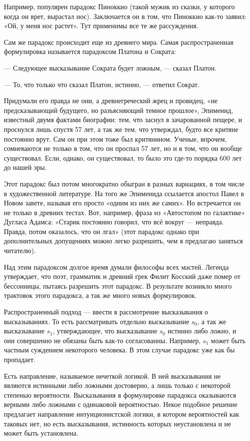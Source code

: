 Например, популярен парадокс Пиноккио (такой мужик из сказки, у которого когда он врет, вырастал нос). Заключается он в том, что Пиноккио как-то заявил: «Ой, у меня нос растет». Тут применимы все те же рассуждения.

Сам же парадокс происходит еще из древнего мира. Самая распространенная формулировка называется парадоксом Платона и Сократа:

— Следующее высказывание Сократа будет ложным, — сказал Платон.

— То, что только что сказал Платон, истинно, — ответил Сократ.

Придумали его правда не они, а древнегреческий жрец и провидец, «не предсказывающий будущего, но разъясняющий темное прошлое», Эпименид, известный двумя фактами биографии: тем, что заснул в зачарованной пещере, и проснулся лишь спустя 57 лет, а так же тем, что утверждал, будто все критяне постоянно врут. Сам он при этом тоже был критянином. Ученые, впрочем, сомневаются не только в том, что он проспал 57 лет, но и в том, что он вообще существовал. Если, однако, он существовал, то было это где-то порядка 600 лет до нашей эры.

Этот парадокс был потом многократно обыгран в разных вариациях, в том числе в художественной литературе. На того же Эпименида ссылается апостол Павел в Новом завете, называя его просто «одним из них же самих». Но встречается он не только в древних тестах. Вот, например, фраза из «Автостопом по галактике» Дугласа Адамса: «Старик постоянно говорил, что всё вокруг — неправда. Правда, потом оказалось, что он лгал» (этот парадокс однако при дополнительных допущениях можно легко разрешить, чем я предлагаю заняться читателю).

Над этим парадоксом долгое время думали философы всех мастей. Легенда утверждает, что поэт, грамматик и древний грек Филит Косский даже помер от бессонницы, пытаясь разрешить этот парадокс. В результате возникло много трактовок этого парадокса, а так же много новых формулировок.

Распространенный подход — ввести в рассмотрение высказывания о высказываниях. То есть рассматривать отдельно высказывание $s_0$, а так же высказывание $s_1$, утверждающее, что высказывание $s_0$ истинно либо ложно, и они совершенно не обязаны быть как-то согласованны. Например, $s_1$ может быть частным суждением некоторого человека. В этом случае парадокс уже как бы пропадает.

Есть направление, называемое нечеткой логикой. В ней высказывания не являются истинными либо ложными достоверно, а лишь только с некоторой степенью вероятности. Высказывания в формулировке парадокса оказываются верными либо ложными с одинаковой вероятностью. Некое подобное решение предлагает направление интуиционистской логики, в котором вероятностей как таковых нет, но есть высказывания, истинность которых неустановлена и не может быть установлена.

